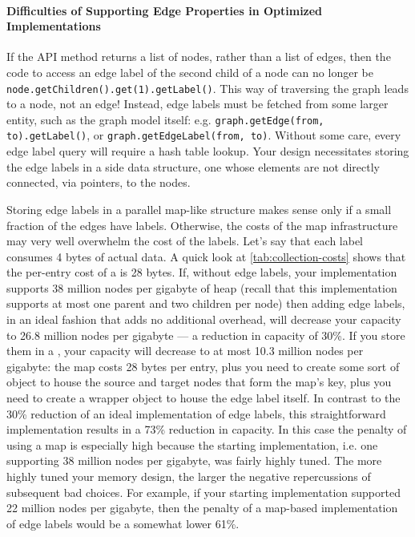 \paragraph{Difficulties of Supporting Edge Properties in Optimized
Implementations} If the API method  returns a list of
nodes, rather than a list of edges, then the code to access an edge label of the
second child of a node can no longer be
\texttt{node.getChildren().\-get(1).getLabel()}. This way of traversing the graph
leads to a node, not an edge! Instead, edge labels must be fetched from some
larger entity, such as the graph model itself: e.g. \texttt{graph.getEdge(from,
to).getLabel()}, or \texttt{graph.getEdgeLabel(from, to)}. Without some care,
every edge label query will require a hash table lookup. Your design necessitates
storing the edge labels in a side data structure, one whose elements are not
directly connected, via pointers, to the nodes.

Storing edge labels in a parallel map-like structure makes sense only if a small
fraction of the edges have labels. Otherwise, the costs of the map infrastructure
may very well overwhelm the cost of the labels. Let's say that each label
consumes 4 bytes of actual data. A quick look at
\autoref{tab:collection-costs} shows that the per-entry cost of a 
is 28 bytes. If, without edge labels, your implementation supports 38 million
nodes per gigabyte of heap (recall that this implementation supports at most
one parent and two children per node)
then adding edge labels, in an ideal fashion that adds no additional overhead,
will decrease your capacity to 26.8 million nodes per gigabyte --- a reduction
in capacity of 30\%.
If you store them in a , your capacity will decrease to at most
10.3 million nodes per gigabyte: the map costs 28 bytes per entry,
plus you need to create some sort of  object to house the source and
target nodes that form the map's key, plus you need to create a wrapper object to
house the edge label itself.
In contrast to the 30\% reduction of an ideal implementation of edge labels,
this straightforward implementation results in a 73\% reduction in capacity. In
this case the penalty of using a map is especially high because the starting
implementation, i.e. one supporting 38 million nodes per gigabyte, was fairly
highly tuned. The more highly tuned your memory design, the larger the negative
repercussions of subsequent bad choices. For example, if your starting
implementation supported 22 million nodes per gigabyte, then the penalty of a
map-based implementation of edge labels would be a somewhat lower 61\%.

